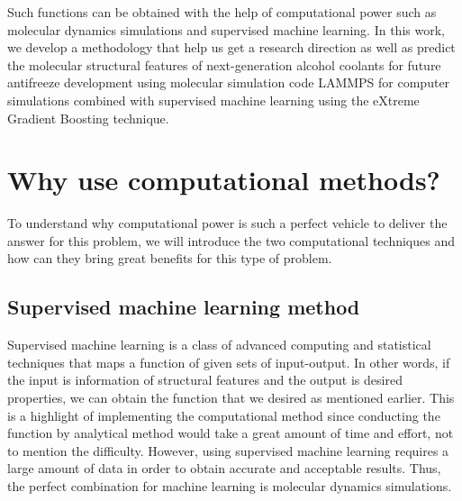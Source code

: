 Such functions can be obtained with the help of computational power such 
as molecular dynamics simulations and supervised machine learning. 
In this work, we develop a methodology that help us get a research 
direction as well as predict the molecular structural features of 
next-generation alcohol coolants for future antifreeze development 
using molecular simulation code LAMMPS for computer simulations combined 
with supervised machine learning using the eXtreme Gradient Boosting technique.
\section{Why use computational methods?}
To understand why computational power is such a perfect vehicle to deliver 
the answer for this problem, we will introduce the two computational 
techniques and how can they bring great benefits for this type of problem.
\subsection{Supervised machine learning method}
Supervised machine learning is a class of advanced computing and statistical 
techniques that maps a function of given sets of input-output. In other words, 
if the input is information of structural features and the output is desired 
properties, we can obtain the function that we desired as mentioned earlier. 
This is a highlight of implementing the computational method since conducting 
the function by analytical method would take a great amount of time and effort, 
not to mention the difficulty. However, using supervised machine learning 
requires a large amount of data in order to obtain accurate and acceptable 
results. Thus, the perfect combination for machine learning is molecular 
dynamics simulations.
